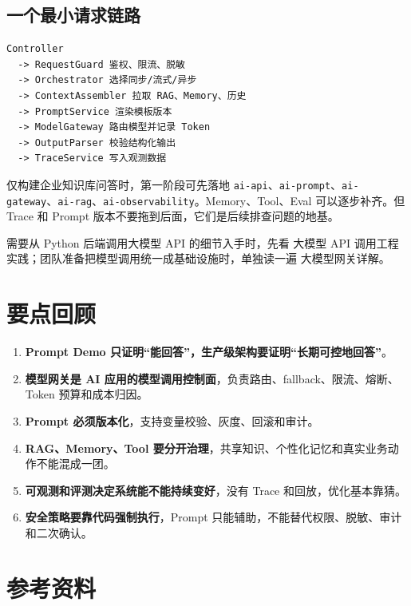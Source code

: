 \documentclass[9pt,a4paper,twocolumn]{ctexart}
\begin{document}
\subsection*{一个最小请求链路}


\begin{lstlisting}
Controller
  -> RequestGuard 鉴权、限流、脱敏
  -> Orchestrator 选择同步/流式/异步
  -> ContextAssembler 拉取 RAG、Memory、历史
  -> PromptService 渲染模板版本
  -> ModelGateway 路由模型并记录 Token
  -> OutputParser 校验结构化输出
  -> TraceService 写入观测数据
\end{lstlisting}



仅构建企业知识库问答时，第一阶段可先落地 \texttt{ai-api}、\texttt{ai-prompt}、\texttt{ai-gateway}、\texttt{ai-rag}、\texttt{ai-observability}。Memory、Tool、Eval 可以逐步补齐。但 Trace 和 Prompt 版本不要拖到后面，它们是后续排查问题的地基。



需要从 Python 后端调用大模型 API 的细节入手时，先看 大模型 API 调用工程实践；团队准备把模型调用统一成基础设施时，单独读一遍 大模型网关详解。



\section*{要点回顾}

\begin{enumerate}[itemsep=1pt, topsep=2pt]
  \item \textbf{Prompt Demo 只证明“能回答”，生产级架构要证明“长期可控地回答”}。
  \item \textbf{模型网关是 AI 应用的模型调用控制面}，负责路由、fallback、限流、熔断、Token 预算和成本归因。
  \item \textbf{Prompt 必须版本化}，支持变量校验、灰度、回滚和审计。
  \item \textbf{RAG、Memory、Tool 要分开治理}，共享知识、个性化记忆和真实业务动作不能混成一团。
  \item \textbf{可观测和评测决定系统能不能持续变好}，没有 Trace 和回放，优化基本靠猜。
  \item \textbf{安全策略要靠代码强制执行}，Prompt 只能辅助，不能替代权限、脱敏、审计和二次确认。
\end{enumerate}


\section*{参考资料}
\end{document}
